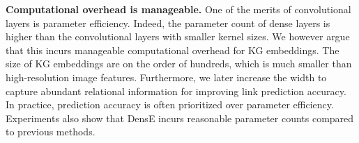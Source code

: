 \noindent\textbf{Computational overhead is manageable.} One of the merits of convolutional layers is parameter efficiency.  Indeed, the parameter count of dense layers is higher than the convolutional layers with smaller kernel sizes. We however argue that this incurs manageable computational overhead for KG embeddings. The size of KG embeddings are on the order of hundreds, which is much smaller than high-resolution image features. Furthermore, we later increase the width to capture abundant relational information for improving link prediction accuracy. In practice, prediction accuracy is often prioritized over parameter efficiency. Experiments also show that DensE incurs reasonable parameter counts compared to previous methods.